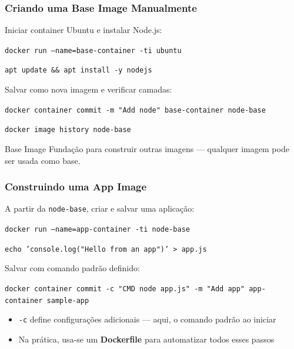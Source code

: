 \begin{frame}
  \frametitle{Criando uma Base Image Manualmente}
  Iniciar container Ubuntu e instalar Node.js:

  \vspace{0.3em}
  \texttt{docker run --name=base-container -ti ubuntu}

  \vspace{0.3em}
  \texttt{apt update \&\& apt install -y nodejs}

  \vspace{0.5em}
  Salvar como nova imagem e verificar camadas:

  \vspace{0.3em}
  \texttt{docker container commit -m "Add node" base-container node-base}

  \vspace{0.3em}
  \texttt{docker image history node-base}

  \vspace{0.5em}
  \begin{block}{Base Image}
    Fundação para construir outras imagens — qualquer imagem pode ser usada como base.
  \end{block}
\end{frame}

\begin{frame}
  \frametitle{Construindo uma App Image}
  A partir da \texttt{node-base}, criar e salvar uma aplicação:

  \vspace{0.3em}
  \texttt{docker run --name=app-container -ti node-base}

  \vspace{0.3em}
  \texttt{echo 'console.log("Hello from an app")' > app.js}

  \vspace{0.5em}
  Salvar com comando padrão definido:

  \vspace{0.3em}
  \texttt{docker container commit -c "CMD node app.js" -m "Add app" app-container sample-app}

  \vspace{0.5em}
  \begin{itemize}
    \item \texttt{-c} define configurações adicionais — aqui, o comando padrão ao iniciar
    \item Na prática, usa-se um \textbf{Dockerfile} para automatizar todos esses passos
  \end{itemize}
\end{frame}